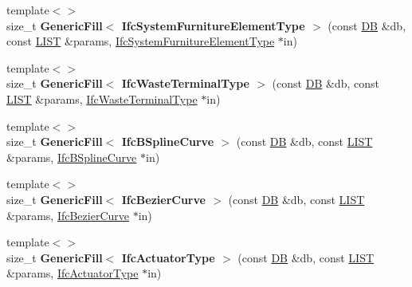 \begin{DoxyCompactItemize}
\item 
\hypertarget{namespace_assimp_1_1_s_t_e_p_a7575225575982a9bc4a8151523f3064b}{{\footnotesize template$<$$>$ }\\size\+\_\+t {\bfseries Generic\+Fill$<$ Ifc\+System\+Furniture\+Element\+Type $>$} (const \hyperlink{class_assimp_1_1_s_t_e_p_1_1_d_b}{D\+B} \&db, const \hyperlink{class_assimp_1_1_s_t_e_p_1_1_e_x_p_r_e_s_s_1_1_l_i_s_t}{L\+I\+S\+T} \&params, \hyperlink{struct_assimp_1_1_i_f_c_1_1_ifc_system_furniture_element_type}{Ifc\+System\+Furniture\+Element\+Type} $\ast$in)}\label{namespace_assimp_1_1_s_t_e_p_a7575225575982a9bc4a8151523f3064b}

\item 
\hypertarget{namespace_assimp_1_1_s_t_e_p_a5251fd4fcb9afa05967308c84b68a42c}{{\footnotesize template$<$$>$ }\\size\+\_\+t {\bfseries Generic\+Fill$<$ Ifc\+Waste\+Terminal\+Type $>$} (const \hyperlink{class_assimp_1_1_s_t_e_p_1_1_d_b}{D\+B} \&db, const \hyperlink{class_assimp_1_1_s_t_e_p_1_1_e_x_p_r_e_s_s_1_1_l_i_s_t}{L\+I\+S\+T} \&params, \hyperlink{struct_assimp_1_1_i_f_c_1_1_ifc_waste_terminal_type}{Ifc\+Waste\+Terminal\+Type} $\ast$in)}\label{namespace_assimp_1_1_s_t_e_p_a5251fd4fcb9afa05967308c84b68a42c}

\item 
\hypertarget{namespace_assimp_1_1_s_t_e_p_a32245951f225ba41df5e3eaa648a42fc}{{\footnotesize template$<$$>$ }\\size\+\_\+t {\bfseries Generic\+Fill$<$ Ifc\+B\+Spline\+Curve $>$} (const \hyperlink{class_assimp_1_1_s_t_e_p_1_1_d_b}{D\+B} \&db, const \hyperlink{class_assimp_1_1_s_t_e_p_1_1_e_x_p_r_e_s_s_1_1_l_i_s_t}{L\+I\+S\+T} \&params, \hyperlink{struct_assimp_1_1_i_f_c_1_1_ifc_b_spline_curve}{Ifc\+B\+Spline\+Curve} $\ast$in)}\label{namespace_assimp_1_1_s_t_e_p_a32245951f225ba41df5e3eaa648a42fc}

\item 
\hypertarget{namespace_assimp_1_1_s_t_e_p_a91f61b7361b0936da88cc5bdf665dc86}{{\footnotesize template$<$$>$ }\\size\+\_\+t {\bfseries Generic\+Fill$<$ Ifc\+Bezier\+Curve $>$} (const \hyperlink{class_assimp_1_1_s_t_e_p_1_1_d_b}{D\+B} \&db, const \hyperlink{class_assimp_1_1_s_t_e_p_1_1_e_x_p_r_e_s_s_1_1_l_i_s_t}{L\+I\+S\+T} \&params, \hyperlink{struct_assimp_1_1_i_f_c_1_1_ifc_bezier_curve}{Ifc\+Bezier\+Curve} $\ast$in)}\label{namespace_assimp_1_1_s_t_e_p_a91f61b7361b0936da88cc5bdf665dc86}

\item 
\hypertarget{namespace_assimp_1_1_s_t_e_p_aaecd1447851571324eca99e9b707c377}{{\footnotesize template$<$$>$ }\\size\+\_\+t {\bfseries Generic\+Fill$<$ Ifc\+Actuator\+Type $>$} (const \hyperlink{class_assimp_1_1_s_t_e_p_1_1_d_b}{D\+B} \&db, const \hyperlink{class_assimp_1_1_s_t_e_p_1_1_e_x_p_r_e_s_s_1_1_l_i_s_t}{L\+I\+S\+T} \&params, \hyperlink{struct_assimp_1_1_i_f_c_1_1_ifc_actuator_type}{Ifc\+Actuator\+Type} $\ast$in)}\label{namespace_assimp_1_1_s_t_e_p_aaecd1447851571324eca99e9b707c377}


\end{DoxyCompactItemize}
